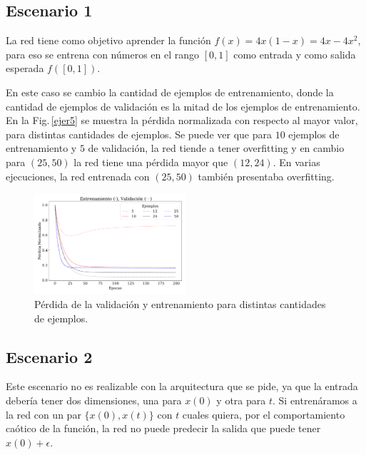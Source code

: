     \subsection*{Escenario 1}
    La red tiene como objetivo aprender la función $f(x)= 4x(1-x)=4x-4x^2$, para eso se entrena con números en el rango  $[0,1]$ como entrada y como salida esperada $f([0,1])$.

    En este caso se cambio la cantidad de ejemplos de entrenamiento, donde la cantidad de ejemplos de validación es la mitad de los ejemplos de entrenamiento. En la Fig.\,\ref{ejer5} se muestra la pérdida normalizada con respecto al mayor valor, para distintas cantidades de ejemplos. Se puede ver que para $10$ ejemplos de entrenamiento y $5$ de validación, la red tiende a tener overfitting y en cambio para $(25,50)$ la red tiene una pérdida mayor que $(12, 24)$. En  varias ejecuciones, la red entrenada con $(25,50)$ también presentaba overfitting.

    \begin{figure}[H]
        \begin{small}
            \begin{center}
                \includegraphics[width=0.5\textwidth]{Graphs/ejer5_los_gen.pdf}
            \end{center}
            \caption{Pérdida de la validación y entrenamiento para distintas cantidades de ejemplos.}
            \label{fig:ejer5}
        \end{small}
    \end{figure}


    \subsection*{Escenario 2}
    Este escenario no es realizable con la arquitectura que se pide, ya que la entrada debería tener dos dimensiones, una para $x(0)$ y otra para $t$.  Si entrenáramos a la red con un par $\{x(0), x(t)\}$ con $t$ cuales quiera, por el comportamiento caótico de la función, la red no puede predecir la salida que puede tener $x(0) + \epsilon$.

